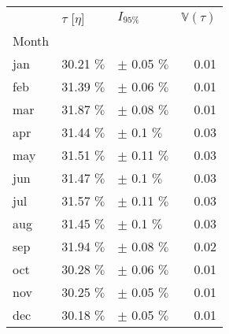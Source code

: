 \begin{tabular}{lllr}
\toprule
{} & $\tau$ [$\eta$] &       $I_{95\%}$ &  $\mathbb{V}(\tau)$ \\
Month &                 &                  &                     \\
\midrule
jan   &      30.21 $\%$ &  $\pm$ 0.05 $\%$ &                0.01 \\
feb   &      31.39 $\%$ &  $\pm$ 0.06 $\%$ &                0.01 \\
mar   &      31.87 $\%$ &  $\pm$ 0.08 $\%$ &                0.01 \\
apr   &      31.44 $\%$ &   $\pm$ 0.1 $\%$ &                0.03 \\
may   &      31.51 $\%$ &  $\pm$ 0.11 $\%$ &                0.03 \\
jun   &      31.47 $\%$ &   $\pm$ 0.1 $\%$ &                0.03 \\
jul   &      31.57 $\%$ &  $\pm$ 0.11 $\%$ &                0.03 \\
aug   &      31.45 $\%$ &   $\pm$ 0.1 $\%$ &                0.03 \\
sep   &      31.94 $\%$ &  $\pm$ 0.08 $\%$ &                0.02 \\
oct   &      30.28 $\%$ &  $\pm$ 0.06 $\%$ &                0.01 \\
nov   &      30.25 $\%$ &  $\pm$ 0.05 $\%$ &                0.01 \\
dec   &      30.18 $\%$ &  $\pm$ 0.05 $\%$ &                0.01 \\
\bottomrule
\end{tabular}
